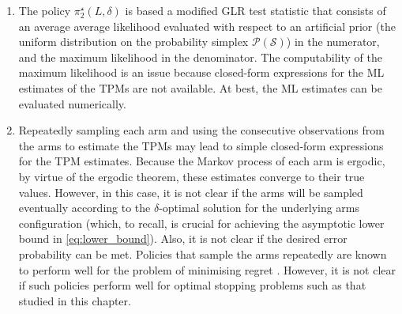 \begin{enumerate}
	\item The policy $\pi_2^\star(L, \delta)$ is based a modified GLR test statistic that consists of an average average likelihood evaluated with respect to an artificial prior (the uniform distribution on the probability simplex $\mathscr{P}(\mathcal{S})$) in the numerator, and the maximum likelihood in the denominator. The computability of the maximum likelihood is an issue because closed-form expressions for the ML estimates of the TPMs are not available. At best, the ML estimates can be evaluated numerically.
	\item Repeatedly sampling each arm and using the consecutive observations from the arms to estimate the TPMs may lead to simple closed-form expressions for the TPM estimates. Because the Markov process of each arm is ergodic, by virtue of the ergodic theorem, these estimates converge to their true values. However, in this case, it is not clear if the arms will be sampled eventually according to the $\delta$-optimal solution for the underlying arms configuration (which, to recall, is crucial for achieving the asymptotic lower bound in \eqref{eq:lower_bound}). Also, it is not clear if the desired error probability can be met. Policies that sample the arms repeatedly are known to perform well for the problem of minimising regret \cite{liu2012learning}. However, it is not clear if such policies perform well for optimal stopping problems such as that studied in this chapter.

\end{enumerate}
